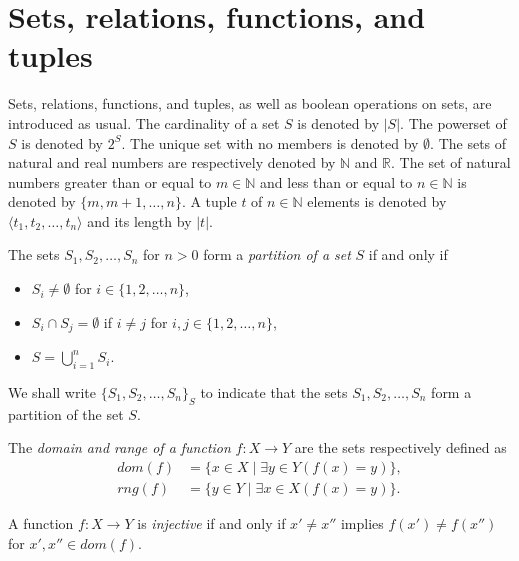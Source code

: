 \section{Sets, relations, functions, and tuples}

Sets, relations, functions, and tuples, as well as boolean operations on sets, are
introduced as usual. The cardinality of a set $S$ is denoted by $|S|$. The powerset
of $S$ is denoted by $2^S$. The unique set with no members is denoted by $\emptyset$.
The sets of natural and real numbers are respectively denoted by $\mathbb{N}$ and
$\mathbb{R}$. The set of natural numbers greater than or equal to $m \in
\mathbb{N}$ and less than or equal to $n \in \mathbb{N}$ is denoted by $\{ m, m+1,
\ldots, n \}$. A tuple $t$ of $n \in \mathbb{N}$ elements is denoted by $\langle t_1,
t_2, \ldots, t_n \rangle$ and its length by $|t|$.

\begin{definition}
  The sets $S_1, S_2, \ldots, S_n$ for $n > 0$ form a \emph{partition of a set} $S$
  if and only if
  \begin{itemize}
    \item $S_i \neq \emptyset$ for $i \in \{ 1, 2, \ldots, n \}$,
    \item $S_i \cap S_j = \emptyset$ if $i \neq j$ for $i, j \in \{ 1, 2, \ldots, n
	    \}$,
    \item $S = \bigcup_{i=1}^n S_i$.
  \end{itemize}
\end{definition}

We shall write ${\{ S_1, S_2, \ldots, S_n \}}_S$ to indicate that the sets $S_1, S_2,
\ldots, S_n$ form a partition of the set $S$.

\begin{definition}
  The \emph{domain and range of a function} $f: X \rightarrow Y$ are the sets
  respectively defined as
  \begin{align*}
    dom(f) & = \{ x \in X \mid \exists y \in Y (f(x) = y) \}, \\
    rng(f) & = \{ y \in Y \mid \exists x \in X (f(x) = y) \}.
  \end{align*}
\end{definition}

\begin{definition}
  A function $f: X \rightarrow Y$ is \emph{injective} if and only if $x' \neq x''$
  implies $f(x') \neq f(x'')$ for $x', x'' \in dom(f)$.
\end{definition}

